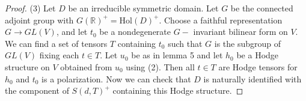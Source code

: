 \begin{proof}
(3) Let $D$ be an irreducible symmetric domain.  Let $G$ be the connected adjoint group with $G(\mathbb R)^+=\text{Hol}(D)^+$. Choose a faithful representation $G \to GL(V)$, and let $t_0$ be a nondegenerate $G-$ invariant bilinear form on $V$. We can find a set of tensors $T$ containing $t_0$ such that $G$ is the subgroup of $GL(V)$ fixing each $t \in T$. Let $u_0$ be as in lemma 5 and let $h_0$ be a Hodge structure on $V$ obtained from $u_0$ using (2). Then all $t \in T$ are Hodge tensors for $h_0$ and $t_0$ is a polarization. Now we can check that $D$ is naturally identified with the component of $S(d,T)^+$ containing this Hodge structure. 
\end{proof}













